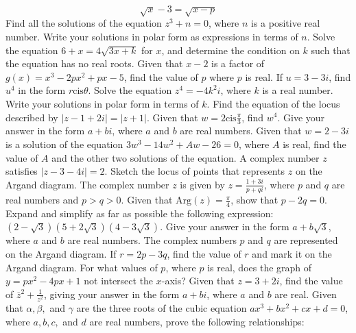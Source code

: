 \documentclass[12pt,addpoints]{exam}
\begin{document}
\begin{questions}
\[
\sqrt{x} - 3 = \sqrt{x - p}
\]
\fillwithlines{5cm}
\question[5] Find all the solutions of the equation \( z^3 + n = 0 \), where \( n \) is a positive real number. Write your solutions in polar form as expressions in terms of \( n \).
\fillwithlines{5cm}
\question[5] Solve the equation \(6 + x = 4\sqrt{3x + k}\) for \(x\), and determine the condition on \(k\) such that the equation has no real roots.
\fillwithlines{5cm}
\question[5] Given that \( x - 2 \) is a factor of \( g(x) = x^3 - 2px^2 + px - 5 \), find the value of \( p \) where \( p \) is real.
\fillwithlines{5cm}
\question[5] If \( u = 3 - 3i \), find \( u^4 \) in the form \( r \text{cis} \theta \).
\fillwithlines{5cm}
\question[5] Solve the equation \( z^4 = -4k^2i \), where \( k \) is a real number. Write your solutions in polar form in terms of \( k \).
\fillwithlines{5cm}
\question[5] Find the equation of the locus described by \( |z - 1 + 2i| = |z + 1| \).
\fillwithlines{5cm}
\question[5] Given that \( w = 2 \text{cis} \frac{\pi}{3} \), find \( w^4 \). Give your answer in the form \( a + bi \), where \( a \) and \( b \) are real numbers.
\fillwithlines{5cm}
\question[5] Given that \( w = 2 - 3i \) is a solution of the equation \( 3w^3 - 14w^2 + Aw - 26 = 0 \), where \( A \) is real, find the value of \( A \) and the other two solutions of the equation.
\fillwithlines{5cm}
\question[5] A complex number \( z \) satisfies \( |z - 3 - 4i| = 2 \). Sketch the locus of points that represents \( z \) on the Argand diagram.
\fillwithlines{5cm}
\question[5] The complex number \( z \) is given by \( z = \frac{1+3i}{p+qi} \), where \( p \) and \( q \) are real numbers and \( p > q > 0 \). Given that \(\text{Arg}(z) = \frac{\pi}{4}\), show that \( p - 2q = 0 \).
\fillwithlines{5cm}
\question[5] Expand and simplify as far as possible the following expression: \((2 - \sqrt{3})(5 + 2\sqrt{3})(4 - 3\sqrt{3})\). Give your answer in the form \( a + b\sqrt{3} \), where \( a \) and \( b \) are real numbers.
\fillwithlines{5cm}
\question[5] The complex numbers \( p \) and \( q \) are represented on the Argand diagram. If \( r = 2p - 3q \), find the value of \( r \) and mark it on the Argand diagram.
\fillwithlines{5cm}
\question[5] For what values of \( p \), where \( p \) is real, does the graph of \( y = px^2 - 4px + 1 \) not intersect the \( x \)-axis?
\fillwithlines{5cm}
\question[5] Given that \( z = 3 + 2i \), find the value of \( \overline{z}^2 + \frac{1}{z^2} \), giving your answer in the form \( a + bi \), where \( a \) and \( b \) are real.
\fillwithlines{5cm}
\question[5] Given that \( \alpha, \beta, \) and \( \gamma \) are the three roots of the cubic equation \( ax^3 + bx^2 + cx + d = 0 \), where \( a, b, c, \) and \( d \) are real numbers, prove the following relationships:


\end{questions}
\end{document}

